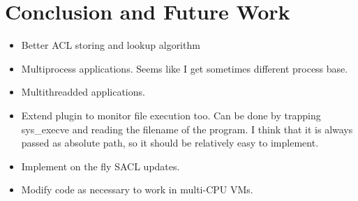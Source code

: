 
\chapter{Conclusion and Future Work}\label{ch:chapter5}

\begin{itemize}
	\item Better \ac{ACL} storing and lookup algorithm 
	\item Multiprocess applications. Seems like I get sometimes different process base.
	\item Multithreadded applications. 
	\item Extend plugin to monitor file execution too. Can be done by trapping sys\_execve and reading the filename of the program. I think that it is always passed as absolute path, so it should be relatively easy to implement.
	\item Implement on the fly \ac{SACL} updates. 
	\item Modify code as necessary to work in multi-CPU \acp{VM}.
\end{itemize}

